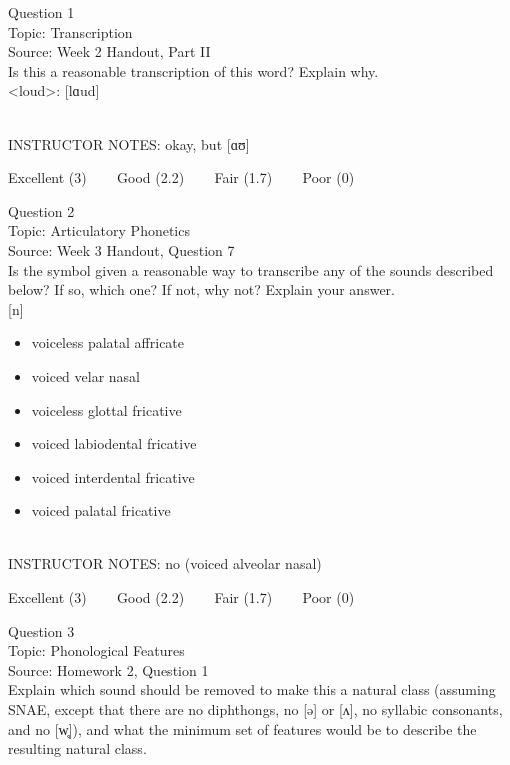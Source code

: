 \documentclass[12pt]{article}
\begin{document}
{\large Question 1}\\

Topic: Transcription\\
Source: Week 2 Handout, Part II\\

Is this a reasonable transcription of this word? Explain why.\\

<loud>: {[lɑud]}


~\\
INSTRUCTOR NOTES: okay, but [ɑʊ]


\vfill
Excellent (3) ~~~ Good (2.2) ~~~ Fair (1.7) ~~~ Poor (0)
\newpage

{\large Question 2}\\

Topic: Articulatory Phonetics\\
Source: Week 3 Handout, Question 7\\

Is the symbol given a reasonable way to transcribe any of the sounds described below? If so, which one? If not, why not? Explain your answer.\\

{[n]}

\begin{itemize} \item voiceless palatal affricate \item voiced velar nasal \item voiceless glottal fricative \item voiced labiodental fricative \item voiced interdental fricative \item voiced palatal fricative \end{itemize}


~\\
INSTRUCTOR NOTES: no (voiced alveolar nasal)


\vfill
Excellent (3) ~~~ Good (2.2) ~~~ Fair (1.7) ~~~ Poor (0)
\newpage

{\large Question 3}\\

Topic: Phonological Features\\
Source: Homework 2, Question 1\\

Explain which sound should be removed to make this a natural class (assuming SNAE, except that there are no diphthongs, no [ə] or [ʌ], no syllabic consonants, and no [w̥]), and what the minimum set of features would be to describe the resulting natural class.\\
\end{document}
